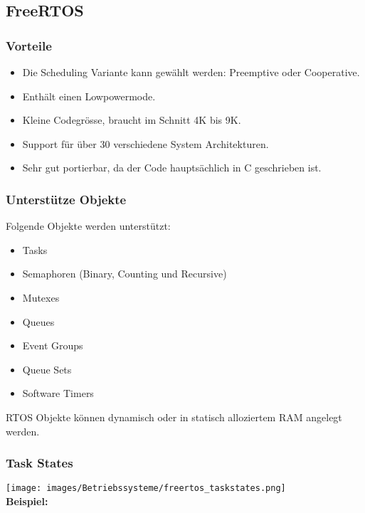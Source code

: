 \subsection{FreeRTOS}
\subsubsection{Vorteile}
\begin{itemize}
    \item Die Scheduling Variante kann gewählt werden: Preemptive oder Cooperative.
    \item Enthält einen Lowpowermode.
    \item Kleine Codegrösse, braucht im Schnitt 4K bis 9K.
    \item Support für über 30 verschiedene System Architekturen.
    \item Sehr gut portierbar, da der Code hauptsächlich in C geschrieben ist.
\end{itemize}
\vspace{-0.5cm}
\subsubsection{Unterstütze Objekte}
Folgende Objekte werden unterstützt:
\vspace{-0.5cm}
\begin{multicols}{2}
    \begin{itemize}
        \item Tasks
        \item Semaphoren (Binary, Counting und Recursive)
        \item Mutexes
        \item Queues
        \item Event Groups
        \item Queue Sets
        \item Software Timers
    \end{itemize}
\end{multicols}
\vspace{-0.5cm}
RTOS Objekte können dynamisch oder in statisch alloziertem RAM angelegt werden.
\vspace{-0.5cm}
\subsubsection{Task States}
\texttt{[image: images/Betriebssysteme/freertos\_taskstates.png]}\\
\textbf{Beispiel:}


